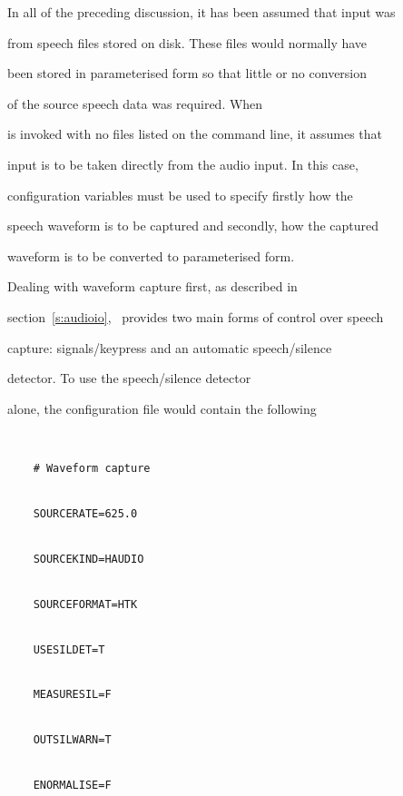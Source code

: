 






In all of the preceding discussion, it has been assumed that input was


from speech files stored on disk.  These files would normally have


been stored in parameterised form so that little or no conversion


of the source speech data was required.   When 


is invoked with no files listed on the command line, it assumes that


input is to be taken directly from the audio input.  In this case,


configuration variables must be used to specify firstly how the


speech waveform is to be captured and secondly, how the captured


waveform is to be converted to parameterised form. 





Dealing with waveform capture first, as described in


section~\ref{s:audioio}, \HTK\ provides two main forms of control over speech


capture: signals/keypress and an automatic speech/silence


detector. To use the speech/silence detector


alone, the configuration file would contain the following


\begin{verbatim}


    # Waveform capture


    SOURCERATE=625.0


    SOURCEKIND=HAUDIO


    SOURCEFORMAT=HTK


    USESILDET=T


    MEASURESIL=F


    OUTSILWARN=T


    ENORMALISE=F


\end{verbatim}





